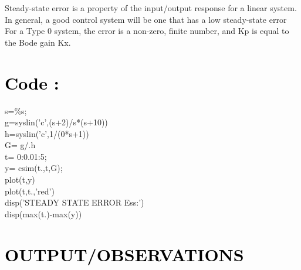 \documentclass[12pt]{article}
\begin{document}
Steady-state error is a property of the input/output response for a linear system. In general, a good control system will be one that has a low steady-state error
For a Type 0 system, the error is a non-zero, finite number, and Kp is equal to the Bode gain Kx. \par

\section*{\textcolor{black}{Code :}}

   s=\%s;\\ 
   g=syslin('c',(s+2)/s*(s+10))\\
   h=syslin('c',1/(0*s+1))\\
   G= g/.h\\
   t= 0:0.01:5;\\
   y= csim(t.,t,G);\\
   plot(t,y)\\
    plot(t,t.,'red')\\
   disp('STEADY STATE ERROR Ess:')\\
   disp(max(t.)-max(y)) \par 

\section*{\textcolor{black}{OUTPUT/OBSERVATIONS}}
\end{document}
